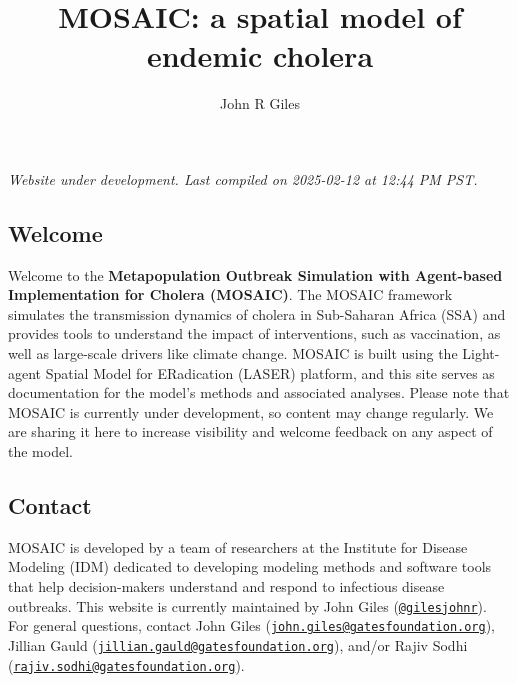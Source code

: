 \documentclass[
]{book}
\title{MOSAIC: a spatial model of endemic cholera}
\author{John R Giles}
\date{}
\begin{document}
\maketitle

{
\setcounter{tocdepth}{1}
\tableofcontents
}
\chapter*{}\label{section}

\hfill\break

{\emph{
Website under development. Last compiled on 2025-02-12 at 12:44 PM PST.
}}

\section*{Welcome}\label{welcome}

Welcome to the \textbf{Metapopulation Outbreak Simulation with Agent-based Implementation for Cholera (MOSAIC)}. The MOSAIC framework simulates the transmission dynamics of cholera in Sub-Saharan Africa (SSA) and provides tools to understand the impact of interventions, such as vaccination, as well as large-scale drivers like climate change. MOSAIC is built using the Light-agent Spatial Model for ERadication (LASER) platform, and this site serves as documentation for the model's methods and associated analyses. Please note that MOSAIC is currently under development, so content may change regularly. We are sharing it here to increase visibility and welcome feedback on any aspect of the model.

\section*{Contact}\label{contact}

MOSAIC is developed by a team of researchers at the Institute for Disease Modeling (IDM) dedicated to developing modeling methods and software tools that help decision-makers understand and respond to infectious disease outbreaks. This website is currently maintained by John Giles (\href{https://github.com/gilesjohnr}{\texttt{@gilesjohnr}}). For general questions, contact John Giles (\href{mailto:john.giles@gatesfoundation.org}{\nolinkurl{john.giles@gatesfoundation.org}}), Jillian Gauld (\href{mailto:jillian.gauld@gatesfoundation.org}{\nolinkurl{jillian.gauld@gatesfoundation.org}}), and/or Rajiv Sodhi (\href{mailto:rajiv.sodhi@gatesfoundation.org}{\nolinkurl{rajiv.sodhi@gatesfoundation.org}}).
\end{document}
